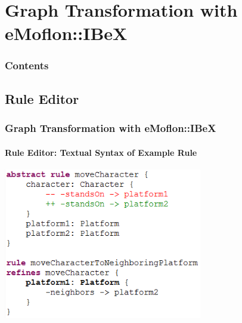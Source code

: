 
\section{Graph Transformation with eMoflon::IBeX}
	\begin{frame}
		\frametitle{Contents}
		\tableofcontents[currentsection]
	\end{frame}

\subsection{Rule Editor}
	\begin{frame}
		\frametitle{Graph Transformation with eMoflon::IBeX}
		\framesubtitle{Rule Editor: Textual Syntax of Example Rule}
		\begin{center}
			\includegraphics[width=0.65\textwidth]{../common/figures/editor-rule-moveCharacter}
		\end{center}
	\end{frame}
